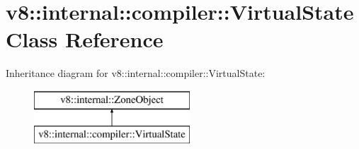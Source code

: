 \hypertarget{classv8_1_1internal_1_1compiler_1_1_virtual_state}{}\section{v8\+:\+:internal\+:\+:compiler\+:\+:Virtual\+State Class Reference}
\label{classv8_1_1internal_1_1compiler_1_1_virtual_state}
Inheritance diagram for v8\+:\+:internal\+:\+:compiler\+:\+:Virtual\+State\+:\begin{figure}[H]
\begin{center}
\leavevmode
\includegraphics[height=2.000000cm]{classv8_1_1internal_1_1compiler_1_1_virtual_state}
\end{center}
\end{figure}
